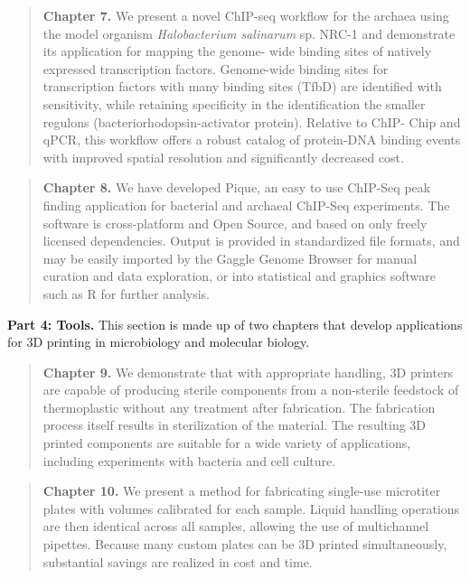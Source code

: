 \begin{quote} \noindent\textbf{Chapter 7.} We present a novel ChIP-seq
workflow for the archaea using the model organism {\em Halobacterium
salinarum} sp. NRC-1 and demonstrate its application for mapping the genome-
wide binding sites of natively expressed transcription factors. Genome-wide
binding sites for transcription factors with many binding sites (TfbD) are
identified with sensitivity, while retaining specificity in the identification
the smaller regulons (bacteriorhodopsin-activator protein). Relative to ChIP-
Chip and qPCR, this workflow offers a robust catalog of protein-DNA binding
events with improved spatial resolution and significantly decreased cost.
\end{quote}

\begin{quote}
\noindent\textbf{Chapter 8.} We have developed Pique, an easy to use ChIP-Seq
peak finding application for bacterial and archaeal ChIP-Seq experiments. The
software is cross-platform and Open Source, and based on only freely licensed
dependencies. Output is provided in standardized file formats, and may be
easily imported by the Gaggle Genome Browser for manual curation and data
exploration, or into statistical and graphics software such as R for further
analysis.
\end{quote}

\noindent\textbf{Part 4: Tools.}
This section is made up of two chapters that develop applications for 3D printing in microbiology and molecular biology. %

\begin{quote} \noindent\textbf{Chapter 9.} We demonstrate that with
appropriate handling, 3D printers are capable of producing sterile components
from a non-sterile feedstock of thermoplastic without any treatment after
fabrication. The fabrication process itself results in sterilization of the
material. The resulting 3D printed components are suitable for a wide variety
of applications, including experiments with bacteria and cell culture.
\end{quote}

\begin{quote} \noindent\textbf{Chapter 10.} We present a method for
fabricating single-use microtiter plates with volumes calibrated for each
sample. Liquid handling operations are then identical across all samples,
allowing the use of multichannel pipettes. Because many custom plates can be
3D printed simultaneously, substantial savings are realized in cost and time.
\end{quote}

